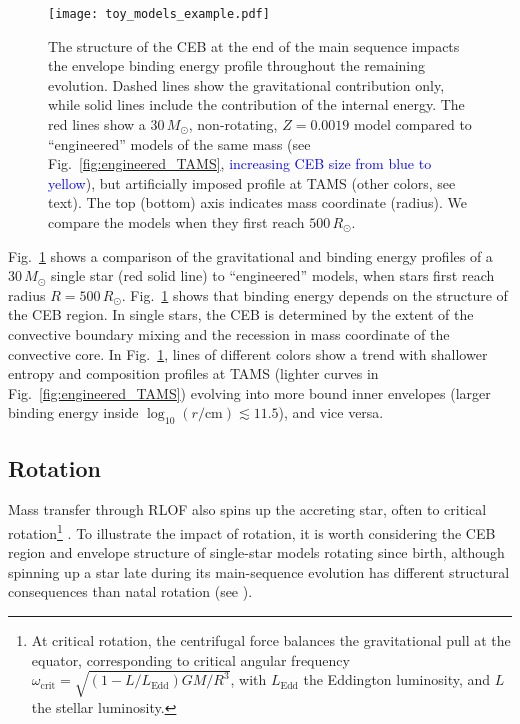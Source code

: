 \documentclass[twocolumn,twocolappendix,trackchanges]{aastex63}
\DeclareRobustCommand{\Figref}[1]{Fig.~\ref{#1}}
\begin{document}
\begin{figure}[htbp]
  \centering
  \texttt{[image: toy\_models\_example.pdf]}
  \caption{The structure of the CEB at the end of the main sequence
    impacts the envelope binding energy profile throughout the
    remaining evolution. Dashed lines show the gravitational
    contribution only, while solid lines include the contribution of
    the internal energy. The red lines show a $30\,M_\odot$,
    non-rotating, $Z=0.0019$ model compared to ``engineered'' models
    of the same mass (see \Figref{fig:engineered_TAMS},
    \textcolor{blue}{increasing CEB size from blue to yellow}), but
    artificially imposed profile at TAMS (other colors, see text). The
    top (bottom) axis indicates mass coordinate (radius). We compare
    the models when they first reach $500\,R_\odot$.}
  \label{fig:toy_models_example}
\end{figure}


\Figref{fig:toy_models_example} shows a comparison of the
gravitational and binding energy profiles of a $30\,M_\odot$ single
star (red solid line) to
``engineered'' models, when stars first
reach radius $R=500\,R_\odot$.
\Figref{fig:toy_models_example} shows that
binding energy depends on the structure of the CEB region. In single
stars, the CEB is determined by the extent of the convective boundary
mixing and the recession in mass coordinate of the
convective core. In \Figref{fig:toy_models_example}, lines of
different colors show a trend with shallower entropy and composition
profiles at TAMS (lighter curves in \Figref{fig:engineered_TAMS})
evolving into more bound inner envelopes (larger
binding energy inside $\log_{10}(r/\mathrm{cm})\lesssim 11.5$), and
vice versa.

\subsection{Rotation}
\label{sec:rot_examples}

Mass transfer through RLOF also spins up the accreting star, often to
critical rotation\footnote{At critical rotation, the centrifugal force
  balances the gravitational pull at the equator, corresponding to
  critical angular frequency
  $\omega_\mathrm{crit}=\sqrt{(1-L/L_\mathrm{Edd})GM/R^3}$, with
  $L_\mathrm{Edd}$ the Eddington luminosity, and $L$ the stellar
  luminosity.} \citep[e.g.,][]{lubow:1975, packet:1981,
  cantiello:2007, renzo:2021zoph}. To illustrate the
  impact of rotation, it is worth considering the CEB
 region and envelope structure
 of single-star models rotating since
birth, although spinning up a star late during its
main-sequence evolution has different structural consequences than
natal rotation (see \citealt{renzo:2021zoph}).
\end{document}

